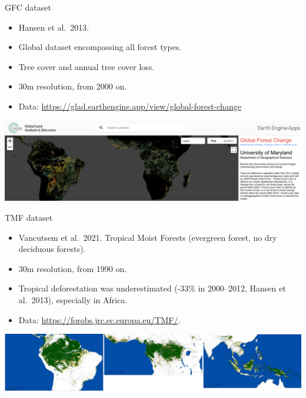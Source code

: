 \documentclass[10pt,table,dvipsnames,compress]{beamer}
\begin{document}
\begin{frame}[label={sec:orgaeedc82}]{GFC dataset}
\begin{itemize}
\item Hansen et al. 2013.
\item Global dataset encompassing all forest types.
\item Tree cover and annual tree cover loss.
\item 30m resolution, from 2000 on.
\item Data: \url{https://glad.earthengine.app/view/global-forest-change}
\end{itemize}

\begin{center}
\includegraphics[width=\textwidth]{figs/gfc.png}
\end{center}
\end{frame}

\begin{frame}[label={sec:org4f33ca0}]{TMF dataset}
\begin{itemize}
\item Vancutsem et al. 2021.
Tropical Moist Forests (evergreen forest, no dry deciduous forests).
\item 30m resolution, from 1990 on.
\item Tropical deforestation was underestimated (-33\% in 2000--2012, Hansen
et al. 2013), especially in Africa.
\item Data: \url{https://forobs.jrc.ec.europa.eu/TMF/}.
\end{itemize}

\vspace{0.25cm}

\begin{center}
\includegraphics[width=\textwidth]{figs/Vancutsem2021-maps-wide.png}
\end{center}
\end{frame}
\end{document}
